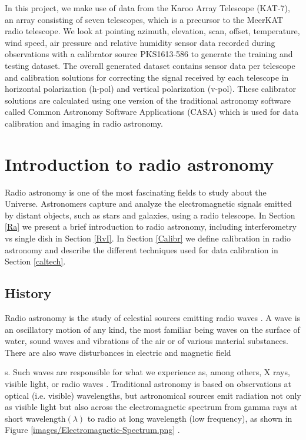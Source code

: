 In this project, we make use of data from the Karoo Array Telescope (KAT-7), an array consisting of seven telescopes, which is a precursor to the MeerKAT radio telescope. We look at pointing azimuth, elevation, scan, offset, temperature, wind speed, air pressure and relative humidity sensor data recorded during observations with a calibrator source PKS1613-586 to generate the training and testing dataset. The overall generated dataset contains sensor data per telescope and calibration solutions for correcting the signal received by each telescope in horizontal polarization (h-pol)  and vertical polarization (v-pol). These calibrator solutions are calculated using one version of the traditional astronomy software called Common Astronomy Software Applications (CASA) which is used for data calibration and imaging in radio astronomy.
 
\section{Introduction to radio astronomy}

Radio astronomy is one of the most fascinating fields to study about the Universe. Astronomers capture and analyze the electromagnetic signals emitted by distant objects, such as stars and galaxies, using a radio telescope. In Section \ref{Ra} we present a brief introduction to radio astronomy, including interferometry vs single dish in Section \ref{RvI}. In Section \ref{Calibr} we define calibration in radio astronomy and describe the different techniques used for data calibration in Section \ref{caltech}.
\label{Ra}
\subsection{History}


Radio astronomy is the study of celestial sources emitting radio waves \citep{verschuur2015invisible}. A wave is an oscillatory motion of any kind, the most familiar being waves on the surface of water, sound waves and vibrations of the air or of various material substances. There are also wave disturbances in electric and magnetic field\newtheorem{mydef}{Definition}s. Such waves are responsible for what we experience as, among others, X rays, visible light, or radio waves \citep{cassidy2002wave}. Traditional astronomy is based on observations at optical (i.e. visible) wavelengths, but astronomical sources emit radiation not only as visible light but
also across the electromagnetic spectrum from gamma rays at short wavelength$(\lambda)$ to radio at long wavelength (low frequency), as shown in Figure \ref{images/Electromagnetic-Spectrum.png} \citep{staats2016genetic}.

